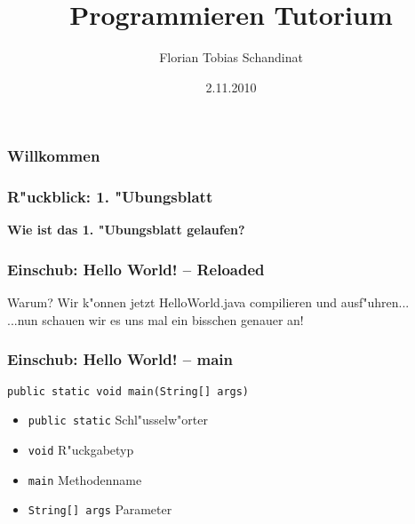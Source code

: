 \documentclass{beamer}
\title{Programmieren Tutorium}
\author{Florian Tobias Schandinat}
\date{2.11.2010}
\institute{FTS}
\begin{document}
\begin{frame}
\frametitle{Willkommen}
\end{frame}


\begin{frame}
\frametitle{R"uckblick: 1. "Ubungsblatt}
\begin{center}
\textbf{\Huge Wie ist das 1. "Ubungsblatt gelaufen?}
\end{center}
\end{frame}


\begin{frame}
\frametitle{Einschub: Hello World! -- Reloaded}
\begin{block}{Warum?}
Wir k"onnen jetzt HelloWorld.java compilieren und ausf"uhren...\pause\\
...nun schauen wir es uns mal ein bisschen genauer an!
\end{block}
\end{frame}


\begin{frame}
\frametitle{Einschub: Hello World! -- main}

\pause
\begin{block}{\texttt{public static void main(String[] args)}}
\begin{itemize}
\item \texttt{public static} Schl"usselw"orter\\
\item \texttt{void} R"uckgabetyp\\
\item \texttt{main} Methodenname\\
\item \texttt{String[] args} Parameter
\end{itemize}
\end{block}
\end{frame}
\end{document}
